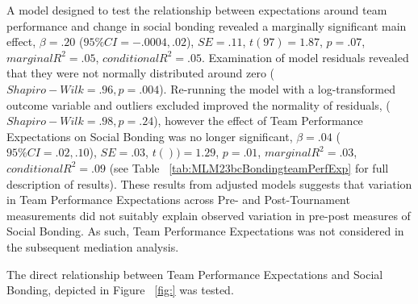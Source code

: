 \begin{CJK}{UTF8}{gbsn}
  A model designed to test the relationship between expectations around team performance and change in social bonding revealed a marginally significant main effect, $\beta = .20$ ($95\% CI =  -.0004, .02$), $SE = .11$, $t(97) = 1.87$, $p = .07$, $marginal R^2 = .05$, $conditional R^2 = .05$.  Examination of model residuals revealed that they were not normally distributed around zero ($Shapiro-Wilk = .96, p = .004$).  Re-running the model with a log-transformed outcome variable and outliers excluded improved the normality of residuals, ($Shapiro-Wilk = .98, p = .24$), however the effect of Team Performance Expectations on Social Bonding was no longer significant, $\beta = .04$ ($95\% CI =  .02, .10$), $SE = .03$, $t()) = 1.29$, $p = .01$, $marginal R^2 = .03$, $conditional R^2 = .09$ (see Table ~\ref{tab:MLM23bcBondingteamPerfExp} for full description of results).
  These results from adjusted models suggests that variation in Team Performance Expectations across Pre- and Post-Tournament measurements did not suitably explain observed variation in pre-post measures of Social Bonding.  As such, Team Performance Expectations was not considered in the subsequent mediation analysis.

  
  \restoregeometry







  The direct relationship between Team Performance Expectations and Social Bonding, depicted in Figure ~\ref{fig:} was tested.


\end{CJK}
